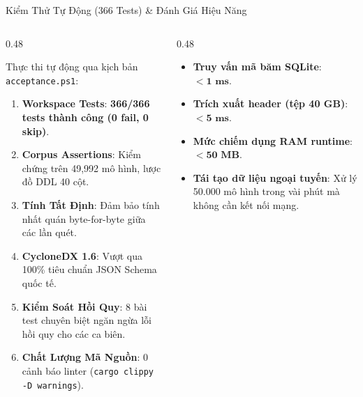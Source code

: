 \documentclass[aspectratio=169, xcolor=table]{beamer}
\begin{document}
\begin{frame}{Kiểm Thử Tự Động (366 Tests) \& Đánh Giá Hiệu Năng}
    \begin{columns}[onlytextwidth, T]
        \begin{column}{0.48\textwidth}
            \begin{successbox}
                \scriptsize
                Thực thi tự động qua kịch bản \texttt{acceptance.ps1}:
                \begin{enumerate}
                    \tiny
                    \item \textbf{Workspace Tests}: \textbf{366/366 tests thành công (0 fail, 0 skip)}.
                    \item \textbf{Corpus Assertions}: Kiểm chứng trên 49,992 mô hình, lược đồ DDL 40 cột.
                    \item \textbf{Tính Tất Định}: Đảm bảo tính nhất quán byte-for-byte giữa các lần quét.
                    \item \textbf{CycloneDX 1.6}: Vượt qua 100\% tiêu chuẩn JSON Schema quốc tế.
                    \item \textbf{Kiểm Soát Hồi Quy}: 8 bài test chuyên biệt ngăn ngừa lỗi hồi quy cho các ca biên.
                    \item \textbf{Chất Lượng Mã Nguồn}: 0 cảnh báo linter (\texttt{cargo clippy -D warnings}).
                \end{enumerate}
            \end{successbox}
        \end{column}
        \hfill
        \begin{column}{0.48\textwidth}
            \begin{infobox}
                \scriptsize
                \begin{itemize}
                    \item \textbf{Truy vấn mã băm SQLite}: $< \mathbf{1\text{ ms}}$.
                    \item \textbf{Trích xuất header (tệp 40 GB)}: $< \mathbf{5\text{ ms}}$.
                    \item \textbf{Mức chiếm dụng RAM runtime}: $< \mathbf{50\text{ MB}}$.
                    \item \textbf{Tái tạo dữ liệu ngoại tuyến}: Xử lý 50.000 mô hình trong vài phút mà không cần kết nối mạng.
                \end{itemize}
            \end{infobox}
        \end{column}
    \end{columns}
\end{frame}
\end{document}
